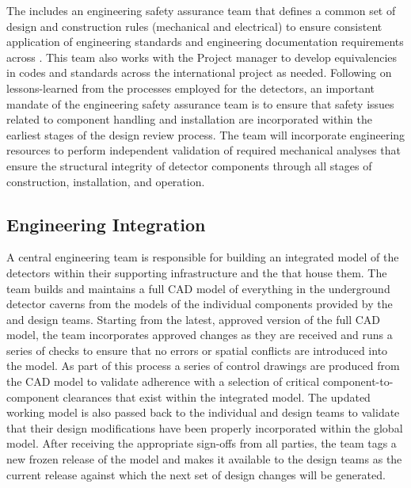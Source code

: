 The  includes an engineering safety assurance team that
defines a common set of design and construction rules (mechanical and
electrical) to ensure consistent application of engineering standards
and engineering documentation requirements across .
This team also works with the Project  manager to develop
equivalencies in codes and standards across the international project
as needed.  Following on lessons-learned from the processes employed
for the  detectors, an important mandate of the
engineering safety assurance team is to ensure that safety issues
related to component handling and installation are incorporated within
the earliest stages of the design review process.  The 
team will incorporate engineering resources to perform independent
validation of required mechanical analyses that ensure the structural
integrity of detector components through all stages of construction,
installation, and operation.

\subsection{Engineering Integration}
\label{sec:dune_engineering}

A central  engineering team is responsible for building 
an integrated model of the detectors within their supporting
infrastructure and the  that house them.  The team 
builds and maintains a full \threed CAD model 
of everything in 
the underground detector caverns from the models of the individual
components provided by the  and  design 
teams.  Starting from the latest, approved version of the full CAD 
model, the  team incorporates approved changes as they 
are received and runs a series of checks to ensure that no errors 
or spatial conflicts are introduced into the model.  As part of 
this process a series of \twod control drawings are produced from 
the \threed CAD model to validate adherence with a selection of 
critical component-to-component clearances that exist within the 
integrated model.  The updated working model is also passed back 
to the individual  and  design teams 
to validate that their design modifications have been properly 
incorporated within the global model.  After receiving the
appropriate sign-offs from all parties, the  team tags 
a new frozen release of the model and makes it available to the 
design teams as the current release against which the next set 
of design changes will be generated.

